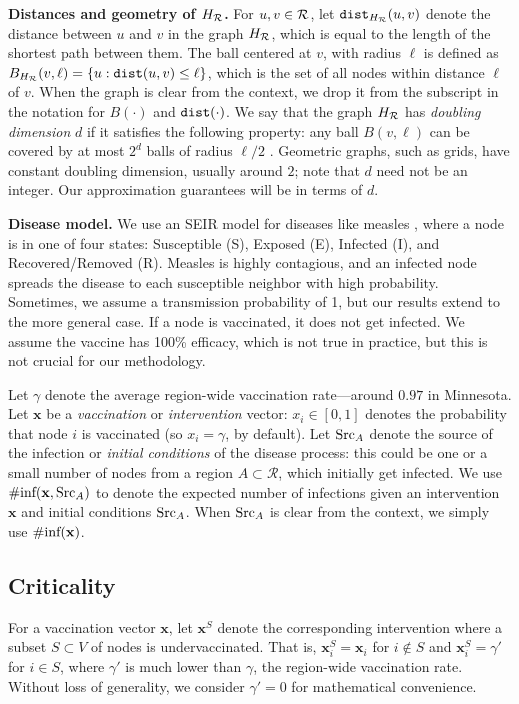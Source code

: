 \noindent
\textbf{Distances and geometry of $H_{\mathcal{R}}$.}
For $u, v\in \mathcal{R}$, let $\texttt{dist}_{H_{\mathcal{R}}}(u, v)$ denote the distance between $u$ and $v$ in the graph $H_{\mathcal{R}}$, which is equal to the length of the shortest path between them.
The ball centered at $v$, with radius $\ell$ is defined as $B_{H_{\mathcal{R}}}(v, \ell)=\{u: \texttt{dist}(u, v)\leq\ell\}$, which is the set of all nodes within distance $\ell$ of $v$. When the graph is clear from the context, we drop it from the subscript in the notation for $B(\cdot)$ and $\texttt{dist}(\cdot)$.
We say that the graph $H_{\mathcal{R}}$ has \emph{doubling dimension} $d$ if it satisfies the following property: any ball $B(v, \ell)$ can be covered by at most $2^d$ balls of radius $\ell/2$ \cite{gupta:focs03}. Geometric graphs, such as grids, have constant doubling dimension, usually around $2$; note that $d$ need not be an integer. Our approximation guarantees will be in terms of $d$.

\noindent
\textbf{Disease model.} We use an SEIR model for diseases like measles \cite{anderson+m:book}, 
where a node is in one of four states:
Susceptible (S), Exposed (E), Infected (I), and Recovered/Removed (R). Measles is highly contagious, and an infected node spreads the
disease to each susceptible neighbor with high probability. 
Sometimes, we assume a transmission probability of 1, but our results
extend to the more general case. If a node is vaccinated,
it does not get infected. We assume the vaccine has 100\% efficacy, which is
not true in practice, but this is not crucial for our methodology.

Let $\gamma$ denote the average region-wide vaccination rate---around $0.97$
in Minnesota. Let $\mathbf{x}$ be a \emph{vaccination} or \emph{intervention} vector: 
$x_i\in[0,1]$ denotes the probability that node $i$ is vaccinated (so $x_i=\gamma$,
by default).
Let $\text{Src}_A$ denote the source of the infection or \emph{initial conditions} of the disease process: this could be one or a small number of nodes from a region $A\subset \mathcal{R}$, which initially get infected. We use $\#\text{inf}(\mathbf{x}, \text{Src}_A)$ to denote the expected number of infections
given an intervention $\mathbf{x}$ and initial conditions $\text{Src}_A$.
When $\text{Src}_A$ is clear from the context, we simply use $\#\text{inf}(\mathbf{x})$.
  
\subsection{Criticality}
For a vaccination vector $\mathbf{x}$,
let $\mathbf{x}^S$ denote the corresponding intervention where a subset $S\subset V$ of
nodes is undervaccinated. That is,
$\mathbf{x}^S_i = \mathbf{x}_i$ for $i\not\in S$ and $\mathbf{x}^S_i=\gamma'$ for $i\in S$,
where $\gamma'$ is much lower than $\gamma$, the region-wide vaccination rate.
Without loss of generality, we consider $\gamma'=0$ for mathematical convenience.

